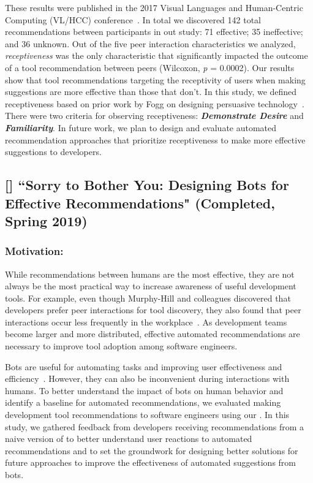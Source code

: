 These results were published in the 2017 Visual Languages and Human-Centric Computing (VL/HCC) conference~\cite{VLHCC}. In total we discovered 142 total recommendations between participants in out study: 71 effective; 35 ineffective; and 36 unknown. Out of the five peer interaction characteristics we analyzed, \textit{receptiveness} was the only characteristic that significantly impacted the outcome of a tool recommendation between peers (Wilcoxon, \textit{p} = 0.0002). Our results show that tool recommendations targeting the receptivity of users when making suggestions are more effective than those that don't. In this study, we defined receptiveness based on prior work by Fogg on designing persuasive technology~\cite{FoggPersuasive}. There were two criteria for observing receptiveness: \textit{\textbf{Demonstrate Desire}} and \textit{\textbf{Familiarity}}. In future work, we plan to design and evaluate automated recommendation approaches that prioritize receptiveness to make more effective suggestions to developers.

\subsection{[\tele] ``Sorry to Bother You: Designing Bots for
Effective Recommendations" (Completed, Spring 2019)}

\subsubsection{Motivation:}

While recommendations between humans are the most effective, they are not always be the most practical way to increase awareness of useful development tools. For example, even though Murphy-Hill and colleagues discovered that developers prefer peer interactions for tool discovery, they also found that peer interactions occur less frequently in the workplace~\cite{Murphy-Hill2011PeerInteraction}. As development teams become larger and more distributed, effective automated recommendations are necessary to improve tool adoption among software engineers.

Bots are useful for automating tasks and improving user effectiveness and efficiency~\cite{StoreyBots}. However, they can also be inconvenient during interactions with humans. To better understand the impact of bots on human behavior and identify a baseline for automated recommendations, we evaluated making development tool recommendations to software engineers using our \telemarketer. In this study, we gathered feedback from developers receiving recommendations from a naive version of \TOOL to better understand user reactions to automated recommendations and to set the groundwork for designing better solutions for future approaches to improve the effectiveness of automated suggestions from bots.

